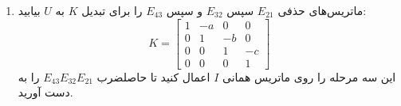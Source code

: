 \documentclass[12pt, a4paper]{book}
\begin{document}
\begin{enumerate}
		(د) $E$ و $F$ معکوس‌های $A$ و $B$ هستند! انتقال همه $E$ها و $F$ها به سمت راست، نتیجه مطلوب $M = $ حاصلضرب $A$ها و $B$ها را به شما می‌دهد. این برای ماتریس‌های صحیح $M$ با درایه‌های مثبت که $ad-bc=1$ دارند، امکان‌پذیر است.
		\item ماتریس‌های حذفی $E_{21}$ سپس $E_{32}$ و سپس $E_{43}$ را برای تبدیل $K$ به $U$ بیابید:
		\[ K = \begin{bmatrix} 1 & -a & 0 & 0 \\ 0 & 1 & -b & 0 \\ 0 & 0 & 1 & -c \\ 0 & 0 & 0 & 1 \end{bmatrix} \]
		این سه مرحله را روی ماتریس همانی $I$ اعمال کنید تا حاصلضرب $E_{43}E_{32}E_{21}$ را به دست آورید.
	\end{enumerate}
	
\end{document}
